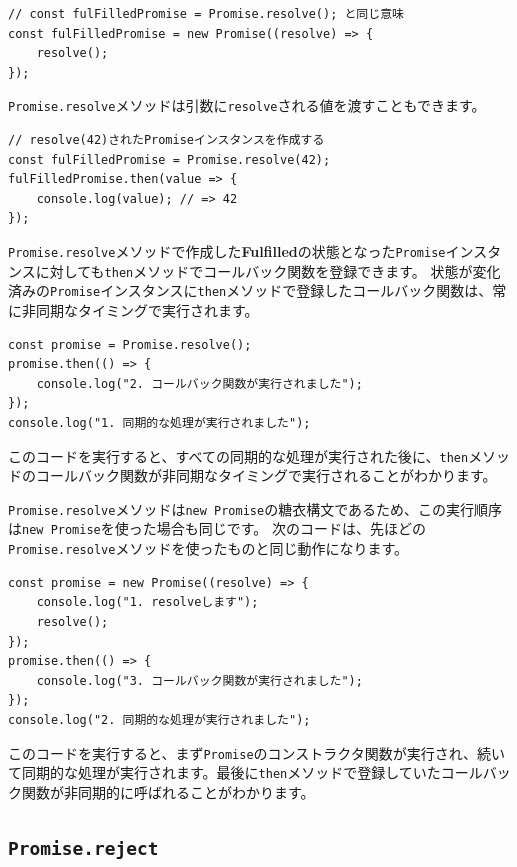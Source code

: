 \begin{lstlisting}
// const fulFilledPromise = Promise.resolve(); と同じ意味
const fulFilledPromise = new Promise((resolve) => {
    resolve();
});
\end{lstlisting}

\texttt{Promise.resolve}メソッドは引数に\texttt{resolve}される値を渡すこともできます。

\begin{lstlisting}
// resolve(42)されたPromiseインスタンスを作成する
const fulFilledPromise = Promise.resolve(42);
fulFilledPromise.then(value => {
    console.log(value); // => 42
});
\end{lstlisting}

\texttt{Promise.resolve}メソッドで作成した\textbf{Fulfilled}の状態となった\texttt{Promise}インスタンスに対しても\texttt{then}メソッドでコールバック関数を登録できます。
状態が変化済みの\texttt{Promise}インスタンスに\texttt{then}メソッドで登録したコールバック関数は、常に非同期なタイミングで実行されます。

\begin{lstlisting}
const promise = Promise.resolve();
promise.then(() => {
    console.log("2. コールバック関数が実行されました");
});
console.log("1. 同期的な処理が実行されました");
\end{lstlisting}

このコードを実行すると、すべての同期的な処理が実行された後に、\texttt{then}メソッドのコールバック関数が非同期なタイミングで実行されることがわかります。

\texttt{Promise.resolve}メソッドは\texttt{new Promise}の糖衣構文であるため、この実行順序は\texttt{new Promise}を使った場合も同じです。
次のコードは、先ほどの\texttt{Promise.resolve}メソッドを使ったものと同じ動作になります。

\begin{lstlisting}
const promise = new Promise((resolve) => {
    console.log("1. resolveします");
    resolve();
});
promise.then(() => {
    console.log("3. コールバック関数が実行されました");
});
console.log("2. 同期的な処理が実行されました");
\end{lstlisting}

このコードを実行すると、まず\texttt{Promise}のコンストラクタ関数が実行され、続いて同期的な処理が実行されます。最後に\texttt{then}メソッドで登録していたコールバック関数が非同期的に呼ばれることがわかります。

\hypertarget{promise-reject}{%
\subsection{\texorpdfstring{\texttt{Promise.reject}}{Promise.reject}}\label{promise-reject}}

